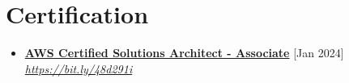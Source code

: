 \documentclass[a4paper]{moderncv}
\begin{document}
\section{Certification}

\begin{itemize}
	\item \textbf{\href{https://aws.amazon.com/certification/certified-solutions-architect-associate/}{AWS Certified Solutions Architect - Associate}} \hfill [Jan 2024]\\
	\textit{\href{https://cp.certmetrics.com/amazon/en/public/verify/credential/c546a05a82c243b895493ff0316a1e67}{https://bit.ly/48d291i}}				
	
	


	
\end{itemize}


\end{document}

